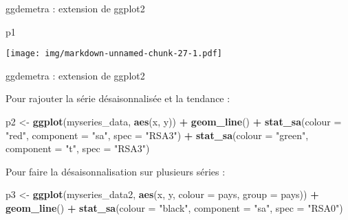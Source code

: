 \documentclass[10pt,xcolor=table,color={dvipsnames,usenames},ignorenonframetext,usepdftitle=false,french]{beamer}
\newenvironment{Shaded}{\begin{snugshade}}{\end{snugshade}}
\newcommand{\DataTypeTok}[1]{\textcolor[rgb]{0.13,0.29,0.53}{#1}}
\newcommand{\KeywordTok}[1]{\textcolor[rgb]{0.13,0.29,0.53}{\textbf{#1}}}
\newcommand{\NormalTok}[1]{#1}
\newcommand{\OperatorTok}[1]{\textcolor[rgb]{0.81,0.36,0.00}{\textbf{#1}}}
\newcommand{\StringTok}[1]{\textcolor[rgb]{0.31,0.60,0.02}{#1}}
\begin{document}
\begin{frame}[fragile]{ggdemetra : extension de ggplot2}
\protect\hypertarget{ggdemetra-extension-de-ggplot2-1}{}

\begin{Shaded}
\begin{Highlighting}[]
\NormalTok{p1}
\end{Highlighting}
\end{Shaded}

\texttt{[image: img/markdown-unnamed-chunk-27-1.pdf]}

\end{frame}

\begin{frame}[fragile]{ggdemetra : extension de ggplot2}
\protect\hypertarget{ggdemetra-extension-de-ggplot2-2}{}

Pour rajouter la série désaisonnalisée et la tendance :

\begin{Shaded}
\begin{Highlighting}[]
\NormalTok{p2 <-}\StringTok{ }\KeywordTok{ggplot}\NormalTok{(myseries_data, }\KeywordTok{aes}\NormalTok{(x, y)) }\OperatorTok{+}\StringTok{ }
\StringTok{  }\KeywordTok{geom_line}\NormalTok{() }\OperatorTok{+}\StringTok{ }
\StringTok{  }\KeywordTok{stat_sa}\NormalTok{(}\DataTypeTok{colour =} \StringTok{"red"}\NormalTok{, }\DataTypeTok{component =} \StringTok{"sa"}\NormalTok{,}
          \DataTypeTok{spec =} \StringTok{"RSA3"}\NormalTok{) }\OperatorTok{+}
\StringTok{  }\KeywordTok{stat_sa}\NormalTok{(}\DataTypeTok{colour =} \StringTok{"green"}\NormalTok{, }\DataTypeTok{component =} \StringTok{"t"}\NormalTok{,}
          \DataTypeTok{spec =} \StringTok{"RSA3"}\NormalTok{)}
\end{Highlighting}
\end{Shaded}

Pour faire la désaisonnalisation sur plusieurs séries :

\begin{Shaded}
\begin{Highlighting}[]
\NormalTok{p3 <-}\StringTok{ }\KeywordTok{ggplot}\NormalTok{(myseries_data2,}
             \KeywordTok{aes}\NormalTok{(x, y, }\DataTypeTok{colour =}\NormalTok{ pays, }\DataTypeTok{group =}\NormalTok{ pays)) }\OperatorTok{+}\StringTok{ }
\StringTok{  }\KeywordTok{geom_line}\NormalTok{() }\OperatorTok{+}\StringTok{ }
\StringTok{  }\KeywordTok{stat_sa}\NormalTok{(}\DataTypeTok{colour =} \StringTok{"black"}\NormalTok{, }\DataTypeTok{component =} \StringTok{"sa"}\NormalTok{,}
          \DataTypeTok{spec =} \StringTok{"RSA0"}\NormalTok{)}
\end{Highlighting}
\end{Shaded}

\end{frame}
\end{document}
